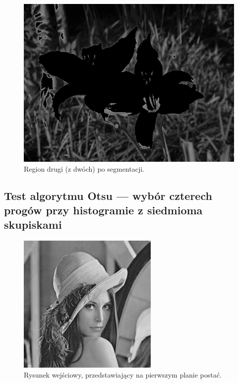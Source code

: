 \documentclass[10pt]{llncs}
\begin{document}
\FloatBarrier

\begin{figure}[h!]
  \centering
  \includegraphics[scale=.3, clip]{img/01_region_02.jpg}
	\caption[]
  {Region drugi (z dwóch) po segmentacji.}
\end{figure}

\FloatBarrier

\subsection{Test algorytmu Otsu --- wybór czterech progów przy histogramie z siedmioma skupiskami}

\FloatBarrier

\begin{figure}[h!]
  \centering
  \includegraphics[scale=.8, clip]{img/02.jpg}
	\caption[]
  {Rysunek wejściowy, przedstawiający na pierwszym planie postać.}
\end{figure}
\end{document}

